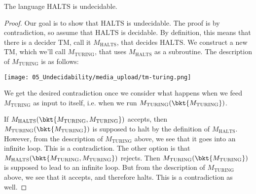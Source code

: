 \begin{flex}
\begin{theorem} \label{theorem:Turings-Theorem}
The language $\mathrm{HALTS}$ is undecidable.
\end{theorem}

\begin{proof}
Our goal is to show that $\text{HALTS}$ is undecidable. The proof is by contradiction, so assume that $\text{HALTS}$ is decidable. By definition, this means that there is a decider TM, call it $M_\text{HALTS}$, that decides $\text{HALTS}$. We construct a new TM, which we'll call $M_\text{TURING}$, that uses $M_\text{HALTS}$ as a subroutine. The description of $M_\text{TURING}$ is as follows:

\begin{center}
\texttt{[image: 05\_Undecidability/media\_upload/tm-turing.png]}
\end{center}

We get the desired contradiction once we consider what happens when we feed $M_\text{TURING}$ as input to itself, i.e. when we run $M_\text{TURING}(\bkt{M_\text{TURING}})$. 

If $M_\text{HALTS}(\bkt{M_\text{TURING},M_\text{TURING}})$ accepts, then $M_\text{TURING}(\bkt{M_\text{TURING}})$ is supposed to halt by the definition of $M_\text{HALTS}$. However, from the description of $M_\text{TURING}$ above, we see that it goes into an infinite loop. This is a contradiction. The other option is that $M_\text{HALTS}(\bkt{M_\text{TURING},M_\text{TURING}})$ rejects. Then $M_\text{TURING}(\bkt{M_\text{TURING}})$ is supposed to lead to an infinite loop. But from the description of $M_\text{TURING}$ above, we see that it accepts, and therefore halts. This is a contradiction as well.
\end{proof}
\end{flex}


